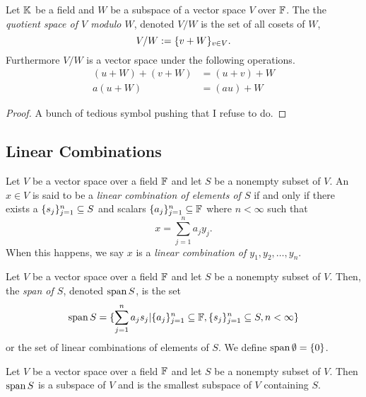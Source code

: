 \begin{definition}
	Let $\mathbb{K}$ be a field and $W$ be a subspace of a vector space $V$ over $\mathbb{F}$.
	The the \textit{quotient space of $V$ modulo $W$}, denoted $V/W$ is the set of all cosets of $W$,
	\[
		V/W := \lbrace v+W \rbrace_{v\in V}.
	\]
	Furthermore $V/W$ is a vector space under the following operations.
	\begin{align*}
		(u+W)+(v+W)&=(u+v)+W\\
		a(u+W)&=(au)+W
	\end{align*}
\end{definition}
\begin{proof}
	A bunch of tedious symbol pushing that I refuse to do.
\end{proof}

\pagebreak

\subsection{Linear Combinations}

\begin{definition}
	Let $V$ be a vector space over a field $\mathbb{F}$ and let $S$ be a nonempty subset of $V$.
	An $x\in V$ is said to be a \textit{linear combination of elements of $S$} if and only if there exists a $\lbrace s_j \rbrace_{j=1}^n\subseteq S$ and scalars $\lbrace a_j \rbrace_{j=1}^n\subseteq\mathbb{F}$ where $n < \infty$ such that
	\[
		x=\sum_{j=1}^n a_j y_j.
	\]
	When this happens, we say $x$ is a \textit{linear combination of $y_1,y_2,\ldots, y_n$}.
\end{definition}

\begin{definition}
	Let $V$ be a vector space over a field $\mathbb{F}$ and let $S$ be a nonempty subset of $V$.
	Then, the \textit{span of $S$}, denoted $\operatorname{span} S$, is the set
	\[
		\operatorname{span} S = \lbrace \sum_{j=1}^n a_j s_j | \lbrace a_j \rbrace_{j=1}^n\subseteq\mathbb{F}, \lbrace s_j \rbrace_{j=1}^n\subseteq S, n<\infty \rbrace
	\]
	or the set of linear combinations of elements of $S$.
	We define $\operatorname{span}\emptyset = \lbrace 0 \rbrace$.
\end{definition}

\begin{thm}
	Let $V$ be a vector space over a field $\mathbb{F}$ and let $S$ be a nonempty subset of $V$.
	Then $\operatorname{span} S$ is a subspace of $V$ and is the smallest subspace of $V$ containing $S$.
\end{thm}

